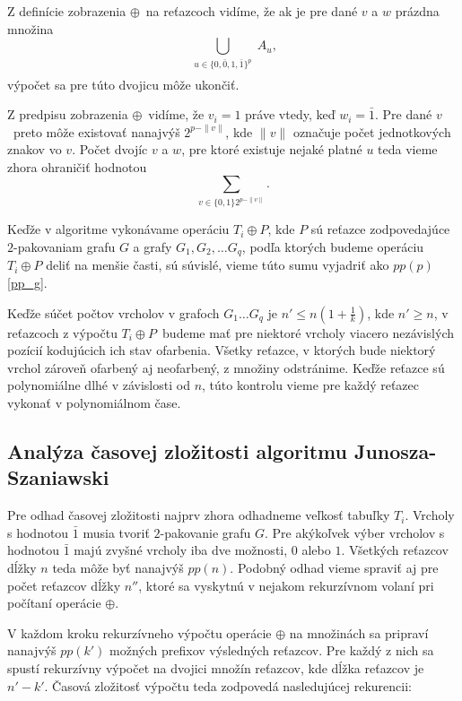 Z definície zobrazenia $\oplus$ na reťazcoch vidíme, že ak je pre dané $v$ a $w$ prázdna množina
$$ \bigcup_{\substack{u \in \{0, \bar{0}, 1, \bar{1}\}^p \\ [u \oplus v = w] }} A_u,$$
výpočet sa pre túto dvojicu môže ukončiť.

Z predpisu zobrazenia $\oplus$ vidíme, že $v_i = 1$ práve vtedy, keď $w_i = \bar{1}$. Pre dané
$v$ preto môže existovať nanajvýš $2^{p - \|v\|}$, kde $\|v\|$ označuje počet jednotkových znakov
vo $v$. Počet dvojíc $v$ a $w$, pre ktoré existuje nejaké platné $u$ teda vieme zhora ohraničiť
hodnotou
$$\sum_{v \in \{0, 1\} 2^{p - \|v\|}}.$$

Keďže v algoritme vykonávame operáciu $T_i \oplus P$, kde $P$ sú reťazce zodpovedajúce
$2$-pakovaniam grafu $G$ a grafy $G_1, G_2, \ldots G_q$, podľa ktorých budeme operáciu $T_i \oplus P$
deliť na menšie časti, sú súvislé, vieme túto sumu vyjadriť ako $pp(p)$\ref{pp_g}.

Keďže súčet počtov vrcholov v grafoch $G_1 \ldots G_q$ je $n' \leq n(1 + \frac{1}{k})$, kde
$n' \ge n$, v reťazcoch z výpočtu $T_i \oplus P$ budeme mať pre niektoré vrcholy viacero
nezávislých pozícií kodujúcich ich stav ofarbenia. Všetky reťazce, v ktorých bude niektorý
vrchol zároveň ofarbený aj neofarbený, z množiny odstránime. Keďže reťazce sú polynomiálne
dlhé v závislosti od $n$, túto kontrolu vieme pre každý reťazec vykonať v polynomiálnom čase.

\subsection{Analýza časovej zložitosti algoritmu Junosza-Szaniawski}

Pre odhad časovej zložitosti najprv zhora odhadneme veľkosť tabuľky $T_i$.
Vrcholy s hodnotou $\bar{1}$ musia tvoriť $2$-pakovanie grafu $G$. Pre akýkoľvek
výber vrcholov s hodnotou $\bar{1}$ majú zvyšné vrcholy iba dve možnosti, $0$ alebo $1$. Všetkých
reťazcov dĺžky $n$ teda môže byť nanajvýš $pp(n)$. Podobný odhad vieme spraviť aj
pre počet reťazcov dĺžky $n''$, ktoré sa vyskytnú v nejakom rekurzívnom volaní pri
počítaní operácie $\oplus$.

V každom kroku rekurzívneho výpočtu operácie $\oplus$ na množinách sa pripraví nanajvýš
$pp(k')$ možných prefixov výsledných reťazcov. Pre každý z nich sa spustí rekurzívny
výpočet na dvojici množín reťazcov, kde dĺžka reťazcov je $n' - k'$. Časová zložitosť
výpočtu teda zodpovedá nasledujúcej rekurencii:

